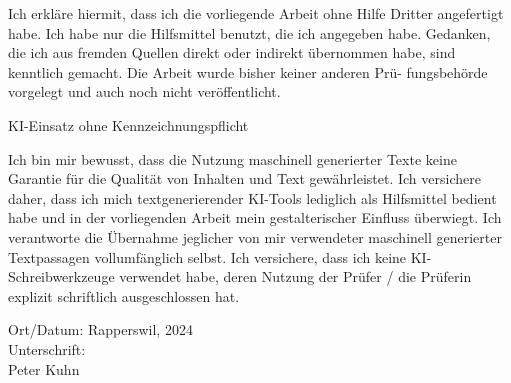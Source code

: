\newpage
Ich erkläre hiermit, dass ich die vorliegende Arbeit ohne Hilfe Dritter angefertigt habe. Ich habe nur
die Hilfsmittel benutzt, die ich angegeben habe. Gedanken, die ich aus fremden Quellen direkt oder
indirekt übernommen habe, sind kenntlich gemacht. Die Arbeit wurde bisher keiner anderen Prü-
fungsbehörde vorgelegt und auch noch nicht veröffentlicht.

KI-Einsatz ohne Kennzeichnungspflicht 

Ich bin mir bewusst, dass die Nutzung maschinell generierter Texte keine Garantie für die Qualität von Inhalten und Text gewährleistet. Ich versichere daher, dass ich mich textgenerierender KI-Tools lediglich als Hilfsmittel bedient habe und in der vorliegenden Arbeit mein gestalterischer Einfluss überwiegt. Ich verantworte die Übernahme jeglicher von mir verwendeter maschinell generierter Textpassagen vollumfänglich selbst. Ich versichere, dass ich keine KI-Schreibwerkzeuge verwendet habe, deren Nutzung der Prüfer / die Prüferin explizit schriftlich ausgeschlossen hat. 


Ort/Datum: Rapperswil, 2024 \\
Unterschrift:\\
Peter Kuhn
